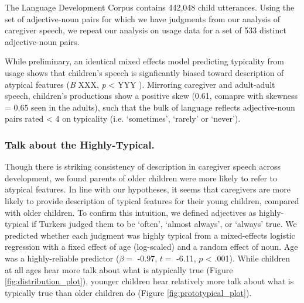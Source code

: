 \documentclass[10pt, letterpaper]{article}
\begin{document}
The Language Development Corpus contains 442,048 child utterances. Using
the set of adjective-noun pairs for which we have judgments from our
analysis of caregiver speech, we repeat our analysis on usage data for a
set of 533 distinct adjective-noun pairs.

While preliminary, an identical mixed effects model predicting
typicality from usage shows that children's speech is signficantly
biased toward description of atypical features (\emph{B} XXX, \emph{p}
\textless{} YYY ). Mirroring caregiver and adult-adult speech,
children's productions show a positive skew (0.61, comapre with skewness
= 0.65 seen in the adults), such that the bulk of language reflects
adjective-noun pairs rated \textless{} 4 on typicality (i.e.
`sometimes', `rarely' or `never').

\hypertarget{talk-about-the-highly-typical.}{%
\subsubsection{Talk about the
Highly-Typical.}\label{talk-about-the-highly-typical.}}

Though there is striking consistency of description in caregiver speech
across development, we found parents of older children were more likely
to refer to atypical features. In line with our hypotheses, it seems
that caregivers are more likely to provide description of typical
features for their young children, compared with older children. To
confirm this intuition, we defined adjectives as highly-typical if
Turkers judged them to be `often', `almost always', or `always' true. We
predicted whether each judgment was highly typical from a mixed-effects
logistic regression with a fixed effect of age (log-scaled) and a random
effect of noun. Age was a highly-reliable predictor (\(\beta =\) -0.97,
\(t =\) -6.11, \(p\) \textless{} .001). While children at all ages hear
more talk about what is atypically true (Figure
\ref{fig:distribution_plot}), younger children hear relatively more talk
about what is typically true than older children do (Figure
\ref{fig:prototypical_plot}).
\end{document}
